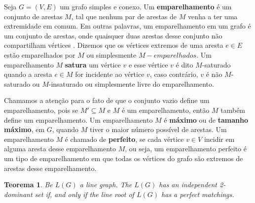 \documentclass[a4paper,8pt]{article}
\theoremstyle{plain}
\newtheorem{theorem}{Teorema}[section]
\begin{document}
Seja $G=(V,E)$ um grafo simples e conexo. Um \textbf{emparelhamento} é um conjunto de arestas $M$, tal que nenhum par de arestas de $M$ venha a ter uma extremidade em comum. Em outras palavras, um emparelhamento em um grafo é um conjunto de arestas, onde quaisquer duas arestas desse conjunto não compartilham vértices \cite{BONDY}.  Dizemos que os vértices extremos de uma aresta $e\in E$ estão emparelhados por $M$ ou simplesmente $M-emparelhados$. Um emparelhamento $M$ \textbf{satura} um vértice $v$ e esse vértice $v$ é dito $M$-saturado quando a aresta $e\in M$ for incidente ao vértice $v$, caso contrário, $v$ é não $M$-saturado ou $M$-insaturado ou simplesmente livre do emparelhamento.

Chamamos a atenção para o fato de que o conjunto vazio define um emparelhamento, pois se $M'\subseteq M$ e $M$ é um emparelhamento, então $M$ também define um emparelhamento. Um emparelhamento $M$ é \textbf{máximo} ou de \textbf{tamanho máximo}, em $G$, quando $M$ tiver o maior número possível de arestas. Um emparelhamento $M$ é chamado de \textbf{perfeito}, se cada vértice $v\in V$ incidir em alguma aresta desse emparelhamento $M$, ou seja, um emparelhamento perfeito é um tipo de emparelhamento em que todas os vértices do grafo são extremos de arestas desse emparelhamento.

\begin{theorem}
 

 
 
 
 
 
 
 
 
 
Be $L(G)$ a line graph. The $L(G)$ has an independent 2-dominant set if, and only if the  line root of $L(G)$ has a perfect matchings.

\end{theorem}
\end{document}
